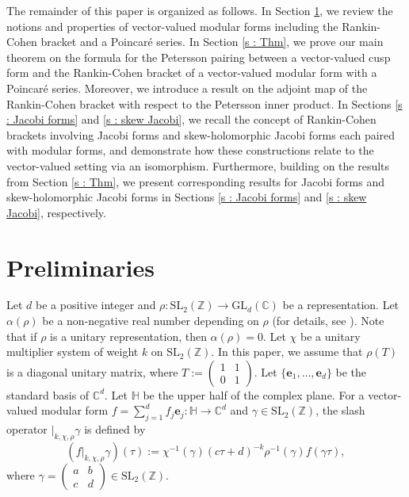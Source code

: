 \documentclass[11pt]{amsart}
\theoremstyle{definition}
\theoremstyle{remark}
\numberwithin{equation}{section}
\newcommand{\sm}{\left(\begin{smallmatrix}}
\newcommand{\esm}{\end{smallmatrix}\right)}
\renewcommand{\(}{\left(}
\renewcommand{\)}{\right)}
\def\GL{\mathrm{GL}}
\begin{document}
The remainder of this paper is organized as follows. 
In Section \ref{s : Pre}, we review the notions and properties of vector-valued modular forms including the Rankin-Cohen bracket and a Poincaré series.
In Section \ref{s : Thm}, we prove our main theorem on the formula for the Petersson pairing between a vector-valued cusp form and the Rankin-Cohen bracket of a vector-valued modular form with a Poincaré series. 
Moreover, we introduce a result on the adjoint map of the Rankin-Cohen bracket with respect to the Petersson inner product. 
In Sections \ref{s : Jacobi forms} and \ref{s : skew Jacobi}, we recall the concept of Rankin-Cohen brackets involving Jacobi forms and skew-holomorphic Jacobi forms each paired with modular forms, and demonstrate how these constructions relate to the vector-valued setting via an isomorphism. 
Furthermore, building on the results from Section \ref{s : Thm}, we present corresponding results for Jacobi forms and skew-holomorphic Jacobi forms in Sections \ref{s : Jacobi forms} and \ref{s : skew Jacobi}, respectively.


\section{Preliminaries}\label{s : Pre}
Let $d$ be a positive integer and $\rho : \mathrm{SL}_{2}(\mathbb{Z})\to \GL_{d}(\mathbb{C})$ be a representation.
Let $\alpha(\rho)$ be a non-negative real number depending on $\rho$ (for details, see \cite{KM2}).
Note that if $\rho$ is a unitary representation, then $\alpha(\rho)=0$.
Let $\chi$ be a unitary multiplier system of weight $k$ on $\mathrm{SL}_{2}(\mathbb{Z})$. 
In this paper, we assume that $\rho\left(T\right)$ is a diagonal unitary matrix, where $T:=\sm 1 & 1 \\
0 & 1 \esm$.
Let $\{\mathbf{e}_{1},\dots,\mathbf{e}_{d}\}$ be the standard basis of $\mathbb{C}^{d}$.
Let $\mathbb{H}$ be the upper half of the complex plane. 
For a vector-valued modular form $f=\sum_{j=1}^{d} f_{j} \mathbf{e}_{j} : \mathbb{H} \to \mathbb{C}^{d}$ and $\gamma\in \mathrm{SL}_{2}(\mathbb{Z})$, the slash operator $|_{k,\chi,\rho}\gamma$ is defined by 
\[ \left(f|_{k,\chi,\rho} \gamma\right)(\tau):=\chi^{-1}(\gamma)(c\tau+d)^{-k}\rho^{-1}(\gamma)f(\gamma \tau), \]
where $\gamma=\sm a & b\\
c & d\esm\in \mathrm{SL}_{2}(\mathbb{Z})$.
\end{document}
